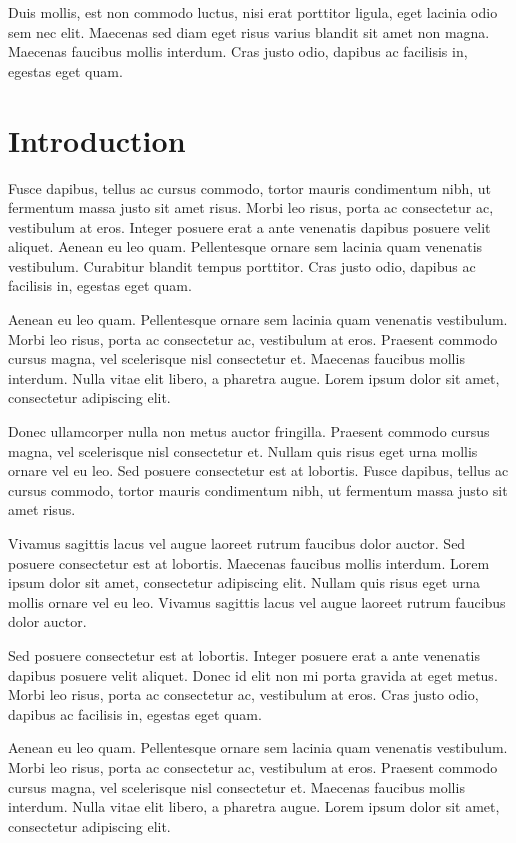 \documentclass[journal]{../template/IEEEtran}
\begin{document}
Duis mollis, est non commodo luctus, nisi erat porttitor ligula, eget lacinia odio sem nec elit. Maecenas sed diam eget risus varius blandit sit amet non magna. Maecenas faucibus mollis interdum. Cras justo odio, dapibus ac facilisis in, egestas eget quam.


\section{Introduction}
 Fusce dapibus, tellus ac cursus commodo, tortor mauris condimentum nibh, ut fermentum massa justo sit amet risus. Morbi leo risus, porta ac consectetur ac, vestibulum at eros. Integer posuere erat a ante venenatis dapibus posuere velit aliquet. Aenean eu leo quam. Pellentesque ornare sem lacinia quam venenatis vestibulum. Curabitur blandit tempus porttitor. Cras justo odio, dapibus ac facilisis in, egestas eget quam.

Aenean eu leo quam. Pellentesque ornare sem lacinia quam venenatis vestibulum. Morbi leo risus, porta ac consectetur ac, vestibulum at eros. Praesent commodo cursus magna, vel scelerisque nisl consectetur et. Maecenas faucibus mollis interdum. Nulla vitae elit libero, a pharetra augue. Lorem ipsum dolor sit amet, consectetur adipiscing elit.

Donec ullamcorper nulla non metus auctor fringilla. Praesent commodo cursus magna, vel scelerisque nisl consectetur et. Nullam quis risus eget urna mollis ornare vel eu leo. Sed posuere consectetur est at lobortis. Fusce dapibus, tellus ac cursus commodo, tortor mauris condimentum nibh, ut fermentum massa justo sit amet risus.

Vivamus sagittis lacus vel augue laoreet rutrum faucibus dolor auctor. Sed posuere consectetur est at lobortis. Maecenas faucibus mollis interdum. Lorem ipsum dolor sit amet, consectetur adipiscing elit. Nullam quis risus eget urna mollis ornare vel eu leo. Vivamus sagittis lacus vel augue laoreet rutrum faucibus dolor auctor.

Sed posuere consectetur est at lobortis. Integer posuere erat a ante venenatis dapibus posuere velit aliquet. Donec id elit non mi porta gravida at eget metus. Morbi leo risus, porta ac consectetur ac, vestibulum at eros. Cras justo odio, dapibus ac facilisis in, egestas eget quam.

Aenean eu leo quam. Pellentesque ornare sem lacinia quam venenatis vestibulum. Morbi leo risus, porta ac consectetur ac, vestibulum at eros. Praesent commodo cursus magna, vel scelerisque nisl consectetur et. Maecenas faucibus mollis interdum. Nulla vitae elit libero, a pharetra augue. Lorem ipsum dolor sit amet, consectetur adipiscing elit.
\end{document}
